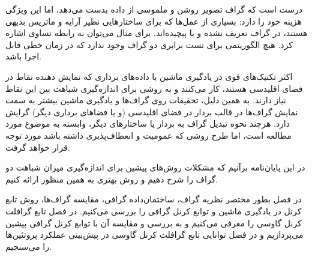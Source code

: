درست است که گراف تصویر روشن و ملموسی از داده بدست می‌دهد، اما این ویژگی هزینه خود را دارد: بسیاری از عمل‌ها که برای ساختارهایی نظیر آرایه و ماتریس بدیهی هستند، در گراف تعریف نشده و یا پیچیده‌اند. برای مثال می‌توان به رابطه تساوی اشاره کرد. هیچ الگوریتمی برای تست برابری دو گراف وجود ندارد که در زمان خطی قابل اجرا باشد.

اکثر تکنیک‌های قوی در یادگیری ماشین با داده‌های برداری که نمایش دهنده نقاط در فضای اقلیدسی هستند، کار می‌کنند و به روشی برای اندازه‌گیری شباهت بین این نقاط نیاز دارند. به همین دلیل، تحقیقات روی گراف‌ها و یادگیری ماشین بیشتر به سمت نمایش گراف‌ها در قالب بردار در فضای اقلیدسی (و یا فضاهای برداری دیگر) گرایش دارد. هرچند نحوه تبدیل گراف به بردار یا ساختارهای دیگر، وابسته به موضوع مورد مطالعه است، اما طرح روشی که عمومیت و انعطاف‌پذیری داشته باشد مورد توجه قرار خواهد گرفت.

در این پایان‌نامه برآنیم که مشکلات روش‌های پیشین برای اندازه‌گیری میزان شباهت دو گراف را شرح دهیم و روش بهتری به همین منظور ارائه کنیم.

در فصل  بطور مختصر نظریه گراف، ساختمان‌داده‌ گرافی، مقایسه گراف‌ها، روش تابع کرنل در یادگیری ماشین و توابع کرنل گرافی را بررسی می‌کنیم. در فصل  تابع گرافلت کرنل گاوسی را معرفی می‌کنیم و به بررسی و مقایسه آن با توابع کرنل گرافی پیشین می‌پردازیم و در فصل  توانایی تابع گرافلت کرنل گاوسی در پیش‌بینی عملکرد پروتئین‌ها را می‌سنجیم.